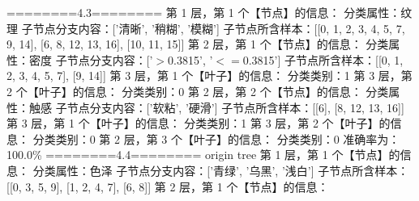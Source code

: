 \documentclass{ctexart}
\begin{document}
\begin{tcolorbox}[colframe = blue, colback = blue!10!white ,  breakable]
========4.3========\newline
第 1 层，第 1 个【节点】的信息：\newline
        分类属性：纹理\newline
        子节点分支内容：['清晰', '稍糊', '模糊']\newline
        子节点所含样本：[[0, 1, 2, 3, 4, 5, 7, 9, 14], [6, 8, 12, 13, 16], [10, 11, 15]]\newline
第 2 层，第 1 个【节点】的信息：\newline
        分类属性：密度\newline
        子节点分支内容：['$>$0.3815', '$<=$0.3815']\newline
        子节点所含样本：[[0, 1, 2, 3, 4, 5, 7], [9, 14]]\newline
第 3 层，第 1 个【叶子】的信息：\newline
        分类类别：1\newline
第 3 层，第 2 个【叶子】的信息：\newline
        分类类别：0\newline
第 2 层，第 2 个【节点】的信息：\newline
        分类属性：触感\newline
        子节点分支内容：['软粘', '硬滑']\newline
        子节点所含样本：[[6], [8, 12, 13, 16]]\newline
第 3 层，第 1 个【叶子】的信息：\newline
        分类类别：1\newline
第 3 层，第 2 个【叶子】的信息：\newline
        分类类别：0\newline
第 2 层，第 3 个【叶子】的信息：\newline
        分类类别：0\newline
准确率为：100.0\%\newline
========4.4========\newline
origin tree\newline
第 1 层，第 1 个【节点】的信息：\newline
        分类属性：色泽\newline
        子节点分支内容：['青绿', '乌黑', '浅白']\newline
        子节点所含样本：[[0, 3, 5, 9], [1, 2, 4, 7], [6, 8]]\newline
第 2 层，第 1 个【节点】的信息：\newline

\end{tcolorbox}
\end{document}
